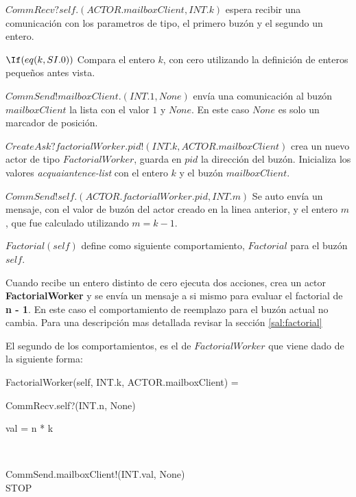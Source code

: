 \begin{description}
 \item $CommRecv?self.(ACTOR.mailboxClient, INT.k)$ espera recibir una comunicación con los parametros de tipo, el primero buzón y el segundo un entero.
 \item $\If (eq(k,SI.0))$ Compara el entero $k$, con cero utilizando la definición de enteros pequeños antes vista.
 \item $CommSend!mailboxClient.(INT.1, None)$ envía una comunicación al buzón $mailboxClient$ la lista con el valor $1$ y $None$. En este caso $None$ es solo un marcador de posición.
 \item $CreateAsk?factorialWorker.pid!(INT.k, ACTOR.mailboxClient)$ crea un nuevo actor de tipo $FactorialWorker$, guarda en $pid$ la dirección del buzón. Inicializa los valores \textit{acquaiantence-list} con el entero $k$ y el buzón $mailboxClient$.
 \item $CommSend!self.(ACTOR.factorialWorker.pid, INT.m)$ Se auto envía un mensaje, con el valor de buzón del actor creado en la linea anterior, y el entero $m$, que fue calculado utilizando $m = k - 1$.
 \item $Factorial(self)$ define como siguiente comportamiento, $Factorial$ para el buzón $self$.
\end{description}

Cuando recibe un entero distinto de cero ejecuta dos acciones, crea un actor \textbf{FactorialWorker} y se envía un mensaje a si mismo para evaluar el factorial de \textbf{n - 1}. En este caso el comportamiento de reemplazo para el buzón actual no cambia. Para una descripción mas detallada revisar la sección \ref{sal:factorial}

El segundo de los comportamientos, es el de $FactorialWorker$ que viene dado de la siguiente forma:

\begin{process}
FactorialWorker(self, INT.k, ACTOR.mailboxClient) = {} \\ \quad
  \begin{block}
  CommRecv.self?(INT.n, None) \then {} \\ \quad
    \begin{block}
    \begin{declaration}
    val = n * k 
    \end{declaration} \\
    \begin{within}
    CommSend.mailboxClient!(INT.val, None) \then \\
    STOP
    \end{within}
    \end{block}
  \end{block}
\end{process}

